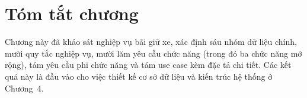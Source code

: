 \section{Tóm tắt chương}

Chương này đã khảo sát nghiệp vụ bãi giữ xe, xác định sáu nhóm dữ liệu chính, mười quy tắc nghiệp vụ, mười lăm yêu cầu chức năng (trong đó ba chức năng mở rộng), tám yêu cầu phi chức năng và tám use case kèm đặc tả chi tiết. Các kết quả này là đầu vào cho việc thiết kế cơ sở dữ liệu và kiến trúc hệ thống ở Chương~4.
\captionsetup[table]{position=above,skip=6pt}
